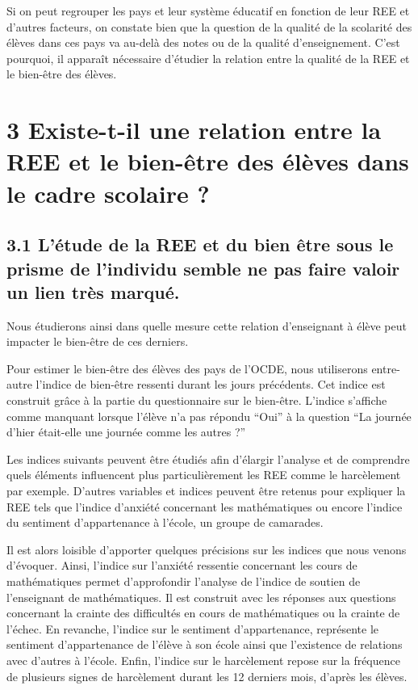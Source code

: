 \documentclass[
  french,
  11pt,
  a4paper,
  oneside]{report}
\begin{document}
Si on peut regrouper les pays et leur système éducatif en fonction de
leur REE et d'autres facteurs, on constate bien que la question de la
qualité de la scolarité des élèves dans ces pays va au-delà des notes ou
de la qualité d'enseignement. C'est pourquoi, il apparaît nécessaire
d'étudier la relation entre la qualité de la REE et le bien-être des
élèves.

\chapter{3 Existe-t-il une relation entre la REE et le bien-être des
élèves dans le cadre scolaire
?}\label{existe-t-il-une-relation-entre-la-ree-et-le-bien-uxeatre-des-uxe9luxe8ves-dans-le-cadre-scolaire}

\section{3.1 L'étude de la REE et du bien être sous le prisme de
l'individu semble ne pas faire valoir un lien très
marqué.}\label{luxe9tude-de-la-ree-et-du-bien-uxeatre-sous-le-prisme-de-lindividu-semble-ne-pas-faire-valoir-un-lien-truxe8s-marquuxe9.}

Nous étudierons ainsi dans quelle mesure cette relation d'enseignant à
élève peut impacter le bien-être de ces derniers.

Pour estimer le bien-être des élèves des pays de l'OCDE, nous
utiliserons entre-autre l'indice de bien-être ressenti durant les jours
précédents. Cet indice est construit grâce à la partie du questionnaire
sur le bien-être. L'indice s'affiche comme manquant lorsque l'élève n'a
pas répondu ``Oui'' à la question ``La journée d'hier était-elle une
journée comme les autres ?''

Les indices suivants peuvent être étudiés afin d'élargir l'analyse et de
comprendre quels éléments influencent plus particulièrement les REE
comme le harcèlement par exemple. D'autres variables et indices peuvent
être retenus pour expliquer la REE tels que l'indice d'anxiété
concernant les mathématiques ou encore l'indice du sentiment
d'appartenance à l'école, un groupe de camarades.

Il est alors loisible d'apporter quelques précisions sur les indices que
nous venons d'évoquer. Ainsi, l'indice sur l'anxiété ressentie
concernant les cours de mathématiques permet d'approfondir l'analyse de
l'indice de soutien de l'enseignant de mathématiques. Il est construit
avec les réponses aux questions concernant la crainte des difficultés en
cours de mathématiques ou la crainte de l'échec. En revanche, l'indice
sur le sentiment d'appartenance, représente le sentiment d'appartenance
de l'élève à son école ainsi que l'existence de relations avec d'autres
à l'école. Enfin, l'indice sur le harcèlement repose sur la fréquence de
plusieurs signes de harcèlement durant les 12 derniers mois, d'après les
élèves.
\end{document}
